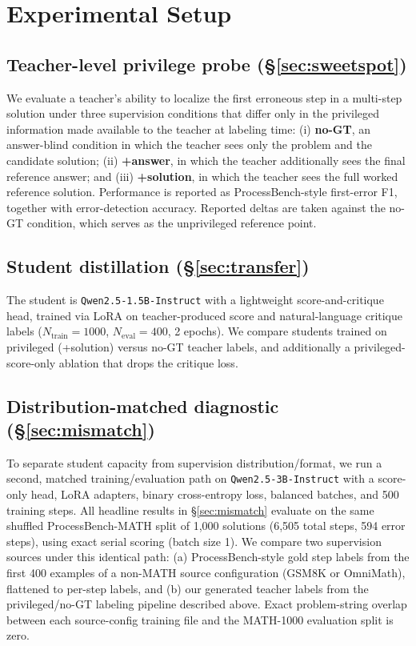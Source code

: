 \documentclass[11pt]{article}
\begin{document}
\section{Experimental Setup}
\label{sec:setup}

\subsection{Teacher-level privilege probe (\S\ref{sec:sweetspot})}
We evaluate a teacher's ability to localize the first erroneous step in a
multi-step solution under three supervision conditions that differ only in
the privileged information made available to the teacher at labeling time:
(i) \textbf{no-GT}, an answer-blind condition in which the teacher sees only
the problem and the candidate solution; (ii) \textbf{+answer}, in which the
teacher additionally sees the final reference answer; and (iii)
\textbf{+solution}, in which the teacher sees the full worked reference
solution. Performance is reported as ProcessBench-style first-error F1,
together with error-detection accuracy. Reported deltas are taken against the
no-GT condition, which serves as the unprivileged reference point.

\subsection{Student distillation (\S\ref{sec:transfer})}
The student is \texttt{Qwen2.5-1.5B-Instruct} with a lightweight
score-and-critique head, trained via LoRA on teacher-produced score and
natural-language critique labels ($N_\text{train}=1000$,
$N_\text{eval}=400$, 2 epochs). We compare students trained on privileged
(+solution) versus no-GT teacher labels, and additionally a
privileged-score-only ablation that drops the critique loss.

\subsection{Distribution-matched diagnostic (\S\ref{sec:mismatch})}
To separate student capacity from supervision distribution/format, we run a
second, matched training/evaluation path on \texttt{Qwen2.5-3B-Instruct}
with a score-only head, LoRA adapters, binary cross-entropy loss, balanced
batches, and 500 training steps. All headline results in
\S\ref{sec:mismatch} evaluate on the same shuffled ProcessBench-MATH split
of 1{,}000 solutions (6{,}505 total steps, 594 error steps), using exact
serial scoring (batch size 1). We compare two supervision sources under this
identical path: (a) ProcessBench-style gold step labels from the first 400
examples of a non-MATH source configuration (GSM8K or OmniMath), flattened
to per-step labels, and (b) our generated teacher labels from the
privileged/no-GT labeling pipeline described above. Exact problem-string
overlap between each source-config training file and the MATH-1000
evaluation split is zero.
\end{document}

